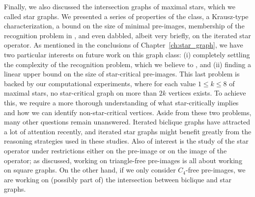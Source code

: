 Finally, we also discussed the intersection graphs of maximal stars, which we called star graphs.
We presented a series of properties of the class, a Krausz-type characterization, a bound on the size of minimal pre-images, membership of the recognition problem in \NP, and even dabbled, albeit very briefly, on the iterated star operator.
As mentioned in the conclusions of Chapter~\ref{ch:star_graph}, we have two particular interests on future work on this graph class: (i) completely settling the complexity of the recognition problem, which we believe to \NPc, and (ii) finding a linear upper bound on the size of star-critical pre-images.
This last problem is backed by our computational experiments, where for each value $1 \leq k \leq 8$ of maximal stars, no star-critical graph on more than $2k$ vertices exists.
To achieve this, we require  a more thorough understanding of what star-critically implies and how we can identify non-star-critical vertices.
Aside from these two problems, many other questions remain unanswered.
Iterated biclique graphs have attracted a lot of attention recently, and iterated star graphs might benefit greatly from the reasoning strategies used in these studies.
Also of interest is the study of the star operator under restrictions either on the pre-image or on the image of the operator; as discussed, working on triangle-free pre-images is all about working on square graphs.
On the other hand, if we only consider $C_4$-free pre-images, we are working on (possibly part of) the intersection between biclique and star graphs.







